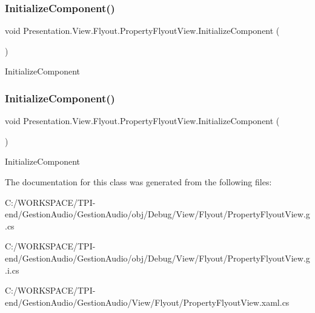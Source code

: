 \subsubsection{\texorpdfstring{Initialize\+Component()}{InitializeComponent()}\hspace{0.1cm}{\footnotesize\ttfamily [3/4]}}
{\footnotesize\ttfamily void Presentation.\+View.\+Flyout.\+Property\+Flyout\+View.\+Initialize\+Component (\begin{DoxyParamCaption}{ }\end{DoxyParamCaption})}



Initialize\+Component 

\mbox{\label{class_presentation_1_1_view_1_1_flyout_1_1_property_flyout_view_a9b44c10f88d02a145b30b550ebfbf1ac}} 
\subsubsection{\texorpdfstring{Initialize\+Component()}{InitializeComponent()}\hspace{0.1cm}{\footnotesize\ttfamily [4/4]}}
{\footnotesize\ttfamily void Presentation.\+View.\+Flyout.\+Property\+Flyout\+View.\+Initialize\+Component (\begin{DoxyParamCaption}{ }\end{DoxyParamCaption})}



Initialize\+Component 



The documentation for this class was generated from the following files\+:\begin{DoxyCompactItemize}
\item 
C\+:/\+W\+O\+R\+K\+S\+P\+A\+C\+E/\+T\+P\+I-\/end/\+Gestion\+Audio/\+Gestion\+Audio/obj/\+Debug/\+View/\+Flyout/Property\+Flyout\+View.\+g.\+cs\item 
C\+:/\+W\+O\+R\+K\+S\+P\+A\+C\+E/\+T\+P\+I-\/end/\+Gestion\+Audio/\+Gestion\+Audio/obj/\+Debug/\+View/\+Flyout/Property\+Flyout\+View.\+g.\+i.\+cs\item 
C\+:/\+W\+O\+R\+K\+S\+P\+A\+C\+E/\+T\+P\+I-\/end/\+Gestion\+Audio/\+Gestion\+Audio/\+View/\+Flyout/Property\+Flyout\+View.\+xaml.\+cs\end{DoxyCompactItemize}

